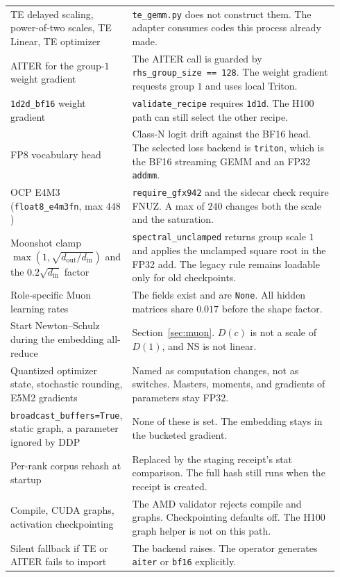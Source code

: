 \documentclass[11pt]{article}
\DeclareRobustCommand{\code}[1]{\texttt{#1}}
\begin{document}
\begin{center}
\begin{longtable}{@{}L{0.30\linewidth}L{0.64\linewidth}@{}}
TE delayed scaling, power-of-two scales, TE Linear, TE optimizer &
\code{te\_gemm.py} does not construct them. The adapter consumes codes this
process already made. \\
AITER for the group-\(1\) weight gradient &
The AITER call is guarded by \code{rhs\_group\_size == 128}. The weight
gradient requests group \(1\) and uses local Triton. \\
\code{1d2d\_bf16} weight gradient &
\code{validate\_recipe} requires \code{1d1d}. The H100 path can still select
the other recipe. \\
FP8 vocabulary head &
Class-N logit drift against the BF16 head. The selected loss backend is
\code{triton}, which is the BF16 streaming GEMM and an FP32 \code{addmm}. \\
OCP E4M3 (\code{float8\_e4m3fn}, max \(448\)) &
\code{require\_gfx942} and the sidecar check require FNUZ. A max of \(240\)
changes both the scale and the saturation. \\
Moonshot clamp \(\max(1,\sqrt{d_{\mathrm{out}}/d_{\mathrm{in}}})\) and the \(0.2\sqrt{d_{\mathrm{in}}}\) factor &
\code{spectral\_unclamped} returns group scale \(1\) and applies the
unclamped square root in the FP32 add. The legacy rule remains loadable only
for old checkpoints. \\
Role-specific Muon learning rates &
The fields exist and are \code{None}. All hidden matrices share \(0.017\)
before the shape factor. \\
Start Newton--Schulz during the embedding all-reduce &
Section~\ref{sec:muon}. \(D(c)\) is not a scale of \(D(1)\), and \(\mathrm{NS}\)
is not linear. \\
Quantized optimizer state, stochastic rounding, E5M2 gradients &
Named as computation changes, not as switches. Masters, moments, and
gradients of parameters stay FP32. \\
\code{broadcast\_buffers=True}, static graph, a parameter ignored by DDP &
None of these is set. The embedding stays in the bucketed gradient. \\
Per-rank corpus rehash at startup &
Replaced by the staging receipt's stat comparison. The full hash still runs
when the receipt is created. \\
Compile, CUDA graphs, activation checkpointing &
The AMD validator rejects compile and graphs. Checkpointing defaults off.
The H100 graph helper is not on this path. \\
Silent fallback if TE or AITER fails to import &
The backend raises. The operator generates \code{aiter} or \code{bf16}
explicitly. \\
\bottomrule
\end{longtable}
\end{center}
\end{document}
